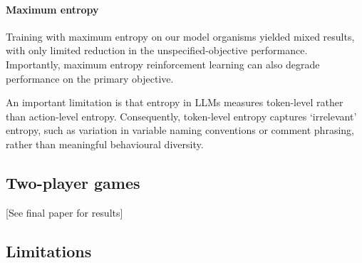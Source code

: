 \paragraph{Maximum entropy}

Training with maximum entropy on our model organisms yielded mixed results, with only limited reduction in the unspecified-objective performance. Importantly, maximum entropy reinforcement learning can also degrade performance on the primary objective.

An important limitation is that entropy in LLMs measures token-level rather than action-level entropy. Consequently, token-level entropy captures `irrelevant' entropy, such as variation in variable naming conventions or comment phrasing, rather than meaningful behavioural diversity.




\subsection{Two-player games}
[See final paper for results]

\subsection{Limitations}

